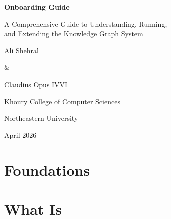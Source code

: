 \documentclass[11pt, letterpaper, openany]{book}
\begin{document}
\frontmatter

\begin{titlepage}
\centering
\vspace*{2.5cm}
{\Huge\bfseries \sysname{} Onboarding Guide\par}
\vspace{1cm}
{\Large A Comprehensive Guide to Understanding, Running,\\
and Extending the \sysname{} Knowledge Graph System\par}
\vspace{3cm}
{\large Ali Shehral\par}
\vspace{0.3cm}
{\large \&\par}
\vspace{0.3cm}
{\large Claudius Opus IV\textperiodcentered VI\par}
\vspace{3cm}
{\large Khoury College of Computer Sciences\par}
{\large Northeastern University\par}
\vspace{1cm}
{\large April 2026\par}
\end{titlepage}
\tableofcontents

\mainmatter

\part{Foundations}




\part{What Is \sysname{}}




\end{document}
